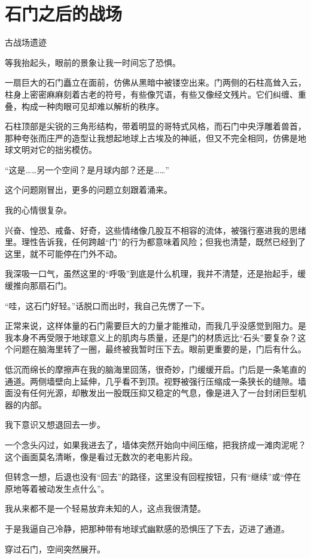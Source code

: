 \chapter{石门之后的战场}

古战场遗迹

等我抬起头，眼前的景象让我一时间忘了恐惧。

一扇巨大的石门矗立在面前，仿佛从黑暗中被镂空出来。门两侧的石柱高耸入云，柱身上密密麻麻刻着古老的符号，有些像咒语，有些又像经文残片。它们纠缠、重叠，构成一种肉眼可见却难以解析的秩序。

石柱顶部是尖锐的三角形结构，带着明显的哥特式风格，而石门中央浮雕着兽首，那种夸张而庄严的造型让我想起地球上古埃及的神祇，但又不完全相同，仿佛是地球文明对它的拙劣模仿。

“这是……另一个空间？是月球内部？还是……”

这个问题刚冒出，更多的问题立刻跟着涌来。

我的心情很复杂。

兴奋、惶恐、戒备、好奇，这些情绪像几股互不相容的流体，被强行塞进我的思绪里。理性告诉我，任何跨越“门”的行为都意味着风险；但我也清楚，既然已经到了这里，就不可能停在门外不动。

我深吸一口气，虽然这里的“呼吸”到底是什么机理，我并不清楚，还是抬起手，缓缓推向那扇石门。

“哇，这石门好轻。”话脱口而出时，我自己先愣了一下。

正常来说，这样体量的石门需要巨大的力量才能推动，而我几乎没感觉到阻力。是我本身不再受限于地球意义上的肌肉与质量，还是门的材质远比“石头”要复杂？这个问题在脑海里转了一圈，最终被我暂时压下去。眼前更重要的是，门后有什么。

低沉而绵长的摩擦声在我的脑海里回荡，很奇妙，门缓缓开启。门后是一条笔直的通道。两侧墙壁向上延伸，几乎看不到顶。视野被强行压缩成一条狭长的缝隙。墙面没有任何光源，却散发出一股既压抑又稳定的气息，像是进入了一台封闭巨型机器的内部。

我下意识又想退回去一步。

一个念头闪过，如果我进去了，墙体突然开始向中间压缩，把我挤成一滩肉泥呢？这个画面莫名清晰，像是看过无数次的老电影片段。

但转念一想，后退也没有“回去”的路径，这里没有回程按钮，只有“继续”或“停在原地等着被动发生点什么”。

我从来都不是一个轻易放弃未知的人，这点我很清楚。

于是我逼自己冷静，把那种带有地球式幽默感的恐惧压了下去，迈进了通道。

穿过石门，空间突然展开。

